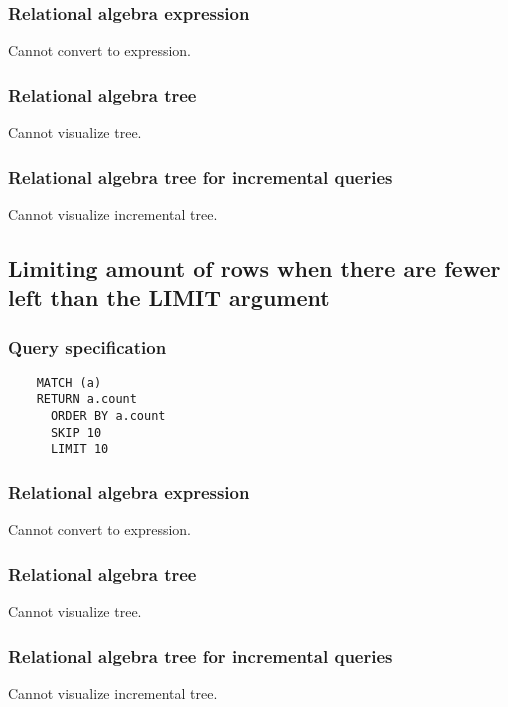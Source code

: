 	\subsubsection*{Relational algebra expression}

	Cannot convert to expression.

	\subsubsection*{Relational algebra tree}

	Cannot visualize tree.

	\subsubsection*{Relational algebra tree for incremental queries}

	Cannot visualize incremental tree.
	\subsection{Limiting amount of rows when there are fewer left than the LIMIT argument}

	\subsubsection*{Query specification}

	\begin{lstlisting}
	MATCH (a)
	RETURN a.count
	  ORDER BY a.count
	  SKIP 10
	  LIMIT 10
	\end{lstlisting}


	\subsubsection*{Relational algebra expression}

	Cannot convert to expression.

	\subsubsection*{Relational algebra tree}

	Cannot visualize tree.

	\subsubsection*{Relational algebra tree for incremental queries}

	Cannot visualize incremental tree.
